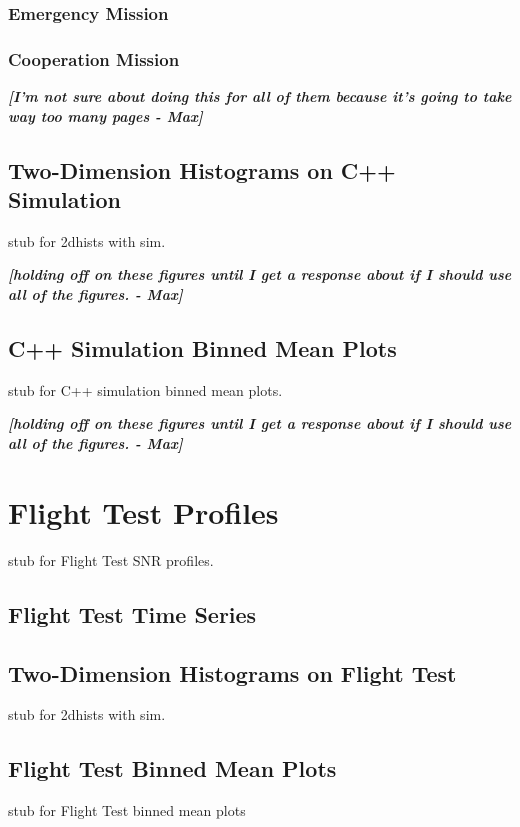 \begin{appendices}
\subsection{Emergency Mission}
\subsection{Cooperation Mission}
\textbf{\textit{[I'm not sure about doing this for all of them because it's going to take way too many pages - Max]}}
\section{Two-Dimension Histograms on C++ Simulation}\label{app:2dHistSim}
\par stub for 2dhists with sim.
\par \textbf{\textit{[holding off on these figures until I get a response about if I should use all of the figures. - Max]}}
\section{C++ Simulation Binned Mean Plots}
\par stub for C++ simulation binned mean plots. \par \textbf{\textit{[holding off on these figures until I get a response about if I should use all of the figures. - Max]}}
\chapter{Flight Test Profiles}\label{app:flightSNRProfiles_all}
\par stub for Flight Test SNR profiles.
\section{Flight Test Time Series}
\section{Two-Dimension Histograms on Flight Test}\label{app:2dHistFlight}
\par stub for 2dhists with sim.
\section{Flight Test Binned Mean Plots}
\par stub for Flight Test binned mean plots



\end{appendices}
